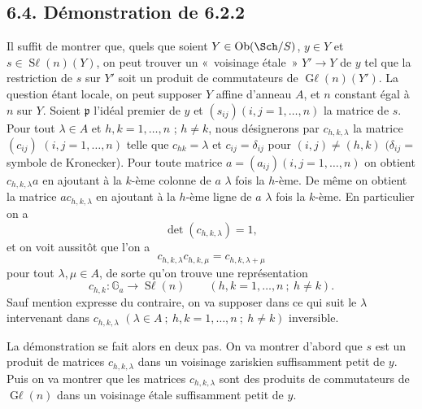 \subsection*{6.4. Démonstration de 6.2.2}
Il suffit de montrer que, quels que soient \(Y\in\operatorname{Ob}(\Sch/S)\), \(y\in Y\) et \(s\in\operatorname{S\ell}(n)(Y)\), on peut trouver un «~voisinage étale~» \(Y'\to Y\) de \(y\) tel que la restriction de \(s\) sur \(Y'\) soit un produit de commutateurs de \(\operatorname{G\ell}(n)(Y')\). La question étant locale, on peut supposer \(Y\) affine d'anneau \(A\), et \(n\) constant égal à \(n\) sur \(Y\). Soient \(\mathfrak p\) l'idéal premier de \(y\) et \((s_{ij})(i,j=1,\ldots,n)\) la matrice de \(s\). Pour tout \(\lambda\in A\) et \(h, k=1,\ldots,n\) ; \(h\ne k\), nous désignerons par \(c_{h,k,\lambda}\) la matrice \((c_{ij})\) \((i,j=1,\ldots,n)\) telle que \(c_{hk}=\lambda\) et \(c_{ij}=\delta_{ij}\) pour \((i,j)\ne(h,k)\) \((\delta_{ij}=\) symbole de Kronecker). Pour toute matrice \(a=(a_{ij})(i,j=1,\ldots,n)\) on obtient \(c_{h,k,\lambda}a\) en ajoutant à la \(k\)-ème colonne de \(a\) \(\lambda\) fois la \(h\)-ème. De même on obtient la matrice \(ac_{h,k,\lambda}\) en ajoutant à la \(h\)-ème ligne de \(a\) \(\lambda\) fois la \(k\)-ème. En particulier on a
\[
 \det(c_{h,k,\lambda})=1,
\]
et on voit aussitôt que l'on a
\begin{equation}\tag{6.3.1}
 c_{h,k,\lambda}c_{h,k,\mu}=c_{h,k,\lambda+\mu}
\end{equation}
pour tout \(\lambda,\mu\in A\), de sorte qu'on trouve une représentation
\[
 c_{h,k}:\mathbb G_a\longrightarrow\operatorname{S\ell}(n)
 \qquad(h,k=1,\ldots,n\ ;\ h\ne k).
\]
Sauf mention expresse du contraire, on va supposer dans ce qui suit le \(\lambda\) intervenant dans \(c_{h,k,\lambda}\) \((\lambda\in A\ ;\ h,k=1,\ldots,n\ ;\ h\ne k)\) inversible.

La démonstration se fait alors en deux pas. On va montrer d'abord que \(s\) est un produit de matrices \(c_{h,k,\lambda}\) dans un voisinage zariskien suffisamment petit de \(y\). Puis on va montrer que les matrices \(c_{h,k,\lambda}\) sont des produits de commutateurs de \(\operatorname{G\ell}(n)\) dans un voisinage étale suffisamment petit de \(y\).

